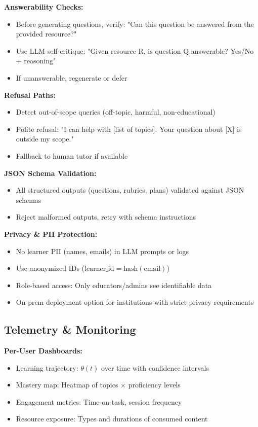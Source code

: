 \documentclass[11pt,letterpaper]{article}
\begin{document}
\textbf{Answerability Checks:}
\begin{itemize}
\item Before generating questions, verify: "Can this question be answered from the provided resource?"
\item Use LLM self-critique: "Given resource R, is question Q answerable? Yes/No + reasoning"
\item If unanswerable, regenerate or defer
\end{itemize}

\textbf{Refusal Paths:}
\begin{itemize}
\item Detect out-of-scope queries (off-topic, harmful, non-educational)
\item Polite refusal: "I can help with [list of topics]. Your question about [X] is outside my scope."
\item Fallback to human tutor if available
\end{itemize}

\textbf{JSON Schema Validation:}
\begin{itemize}
\item All structured outputs (questions, rubrics, plans) validated against JSON schemas
\item Reject malformed outputs, retry with schema instructions
\end{itemize}

\textbf{Privacy \& PII Protection:}
\begin{itemize}
\item No learner PII (names, emails) in LLM prompts or logs
\item Use anonymized IDs ($\text{learner\_id} = \text{hash}(\text{email})$)
\item Role-based access: Only educators/admins see identifiable data
\item On-prem deployment option for institutions with strict privacy requirements
\end{itemize}

\subsection{Telemetry \& Monitoring}\label{subsec:telemetry-monitoring}

\textbf{Per-User Dashboards:}
\begin{itemize}
\item Learning trajectory: $\theta(t)$ over time with confidence intervals
\item Mastery map: Heatmap of topics $\times$ proficiency levels
\item Engagement metrics: Time-on-task, session frequency
\item Resource exposure: Types and durations of consumed content
\end{itemize}
\end{document}
